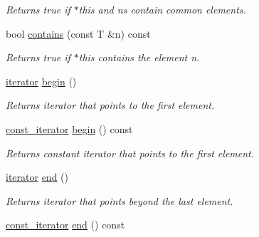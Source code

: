 \begin{CompactItemize}
\begin{CompactList}\small\item\em Returns true if $\ast$this and ns contain common elements. \item\end{CompactList}\item 
\hypertarget{classdai_1_1smallSet_82eff80e70adf8c0a541c0a505522b32}{
bool \hyperlink{classdai_1_1smallSet_82eff80e70adf8c0a541c0a505522b32}{contains} (const T \&n) const }
\label{classdai_1_1smallSet_82eff80e70adf8c0a541c0a505522b32}

\begin{CompactList}\small\item\em Returns true if $\ast$this contains the element n. \item\end{CompactList}\item 
\hypertarget{classdai_1_1smallSet_6a14836b896a8bb1901ea79fd45394d0}{
\hyperlink{classdai_1_1smallSet_254dd4f8cad9c7bce5522e9dbcfc4f49}{iterator} \hyperlink{classdai_1_1smallSet_6a14836b896a8bb1901ea79fd45394d0}{begin} ()}
\label{classdai_1_1smallSet_6a14836b896a8bb1901ea79fd45394d0}

\begin{CompactList}\small\item\em Returns iterator that points to the first element. \item\end{CompactList}\item 
\hypertarget{classdai_1_1smallSet_3f0650aa385a3fa8baa1903762815203}{
\hyperlink{classdai_1_1smallSet_103c819872818d14a7234a1f618a815c}{const\_\-iterator} \hyperlink{classdai_1_1smallSet_3f0650aa385a3fa8baa1903762815203}{begin} () const }
\label{classdai_1_1smallSet_3f0650aa385a3fa8baa1903762815203}

\begin{CompactList}\small\item\em Returns constant iterator that points to the first element. \item\end{CompactList}\item 
\hypertarget{classdai_1_1smallSet_9927551b475689ed06d0380f26df8eea}{
\hyperlink{classdai_1_1smallSet_254dd4f8cad9c7bce5522e9dbcfc4f49}{iterator} \hyperlink{classdai_1_1smallSet_9927551b475689ed06d0380f26df8eea}{end} ()}
\label{classdai_1_1smallSet_9927551b475689ed06d0380f26df8eea}

\begin{CompactList}\small\item\em Returns iterator that points beyond the last element. \item\end{CompactList}\item 
\hypertarget{classdai_1_1smallSet_1d4c72c01f605b4bc65c73d1ba259e05}{
\hyperlink{classdai_1_1smallSet_103c819872818d14a7234a1f618a815c}{const\_\-iterator} \hyperlink{classdai_1_1smallSet_1d4c72c01f605b4bc65c73d1ba259e05}{end} () const }
\label{classdai_1_1smallSet_1d4c72c01f605b4bc65c73d1ba259e05}


\end{CompactItemize}
